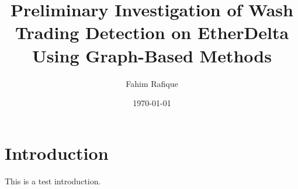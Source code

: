 \documentclass{hsmw-thesis}
\title{Preliminary Investigation of Wash Trading Detection on EtherDelta Using Graph-Based Methods}
\author{Fahim Rafique}
\date{\today}
\begin{document}
\maketitle

\tableofcontents

\chapter{Introduction}
This is a test introduction.
\end{document}
